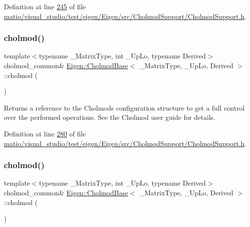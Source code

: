 Definition at line \hyperlink{matio_2visual__studio_2test_2eigen_2_eigen_2src_2_cholmod_support_2_cholmod_support_8h_source_l00245}{245} of file \hyperlink{matio_2visual__studio_2test_2eigen_2_eigen_2src_2_cholmod_support_2_cholmod_support_8h_source}{matio/visual\+\_\+studio/test/eigen/\+Eigen/src/\+Cholmod\+Support/\+Cholmod\+Support.\+h}.

\mbox{\label{class_eigen_1_1_cholmod_base_a6a85bf52d6aa480240a64f277d7f96c6}} 
\subsubsection{\texorpdfstring{cholmod()}{cholmod()}\hspace{0.1cm}{\footnotesize\ttfamily [1/2]}}
{\footnotesize\ttfamily template$<$typename \+\_\+\+Matrix\+Type, int \+\_\+\+Up\+Lo, typename Derived$>$ \\
cholmod\+\_\+common\& \hyperlink{class_eigen_1_1_cholmod_base}{Eigen\+::\+Cholmod\+Base}$<$ \+\_\+\+Matrix\+Type, \+\_\+\+Up\+Lo, Derived $>$\+::cholmod (\begin{DoxyParamCaption}{ }\end{DoxyParamCaption})\hspace{0.3cm}{\ttfamily [inline]}}

Returns a reference to the Cholmod\textquotesingle{}s configuration structure to get a full control over the performed operations. See the Cholmod user guide for details. 

Definition at line \hyperlink{matio_2visual__studio_2test_2eigen_2_eigen_2src_2_cholmod_support_2_cholmod_support_8h_source_l00280}{280} of file \hyperlink{matio_2visual__studio_2test_2eigen_2_eigen_2src_2_cholmod_support_2_cholmod_support_8h_source}{matio/visual\+\_\+studio/test/eigen/\+Eigen/src/\+Cholmod\+Support/\+Cholmod\+Support.\+h}.

\mbox{\label{class_eigen_1_1_cholmod_base_a6a85bf52d6aa480240a64f277d7f96c6}} 
\subsubsection{\texorpdfstring{cholmod()}{cholmod()}\hspace{0.1cm}{\footnotesize\ttfamily [2/2]}}
{\footnotesize\ttfamily template$<$typename \+\_\+\+Matrix\+Type, int \+\_\+\+Up\+Lo, typename Derived$>$ \\
cholmod\+\_\+common\& \hyperlink{class_eigen_1_1_cholmod_base}{Eigen\+::\+Cholmod\+Base}$<$ \+\_\+\+Matrix\+Type, \+\_\+\+Up\+Lo, Derived $>$\+::cholmod (\begin{DoxyParamCaption}{ }\end{DoxyParamCaption})\hspace{0.3cm}{\ttfamily [inline]}}

